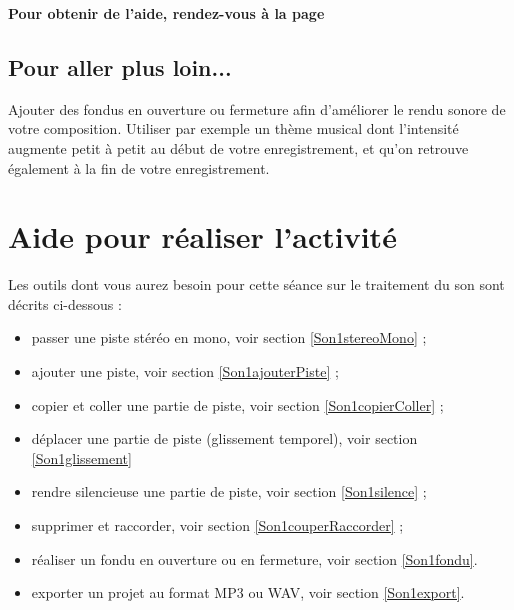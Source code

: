 \textbf{Pour obtenir de l'aide, rendez-vous à la page \pageref{Son5eOutils}}





\subsection{Pour aller plus loin...}

Ajouter des fondus en ouverture ou fermeture afin d'améliorer le rendu sonore de votre composition. Utiliser par exemple un thème musical dont l'intensité augmente petit à petit au début de votre enregistrement, et qu'on retrouve également à la fin de votre enregistrement.

\vfill
\phantom{rien} 

\newpage


\section{Aide pour réaliser l'activité}\label{Son5eOutils}

Les outils dont vous aurez besoin pour cette séance sur le traitement du son sont décrits ci-dessous :

\begin{itemize}   
\item passer une piste stéréo en mono, voir section \vref{Son1stereoMono} ;
\item ajouter une piste, voir section \vref{Son1ajouterPiste} ;
\item copier et coller une partie de piste, voir section \vref{Son1copierColler} ;
\item déplacer une partie de piste (glissement temporel), voir section \vref{Son1glissement}
\item rendre silencieuse une partie de piste, voir section \vref{Son1silence} ;
\item supprimer et raccorder, voir section \vref{Son1couperRaccorder} ;
\item réaliser un fondu en ouverture ou en fermeture, voir section \vref{Son1fondu}.
\item exporter un projet au format MP3 ou WAV, voir section \vref{Son1export}.
\end{itemize} 



